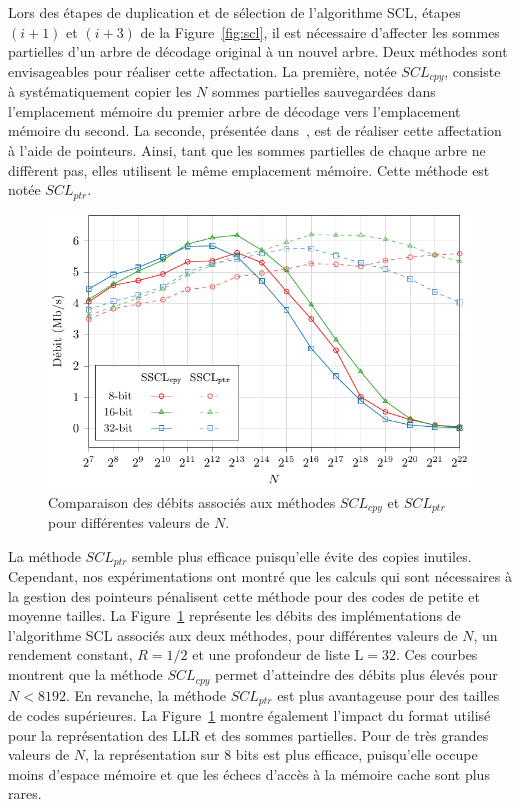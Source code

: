 Lors des étapes de duplication et de sélection de l'algorithme SCL, étapes $(i+1)$ et $(i+3)$ de la Figure~\ref{fig:scl}, il est nécessaire d'affecter les sommes partielles d'un arbre de décodage original à un nouvel arbre. Deux méthodes sont envisageables pour réaliser cette affectation. La première, notée $SCL_{cpy}$, consiste à systématiquement copier les $N$ sommes partielles sauvegardées dans l'emplacement mémoire du premier arbre de décodage vers l'emplacement mémoire du second. La seconde, présentée dans~\cite{tal_list_2011}, est de réaliser cette affectation à l'aide de pointeurs. Ainsi, tant que les sommes partielles de chaque arbre ne diffèrent pas, elles utilisent le même emplacement mémoire. Cette méthode est notée $SCL_{ptr}$.

\begin{figure}
\centering
\includegraphics{main/ch2_fig/curves/thr/tikz/thr}
\caption{Comparaison des débits associés aux méthodes $SCL_{cpy}$ et $SCL_{ptr}$ pour différentes valeurs de $N$.}
\label{fig:scl_mem}
\end{figure}

La méthode $SCL_{ptr}$ semble plus efficace puisqu'elle évite des copies inutiles. Cependant, nos expérimentations ont montré que les calculs qui sont nécessaires à la gestion des pointeurs pénalisent cette méthode pour des codes de petite et moyenne tailles. La Figure~\ref{fig:scl_mem} représente les débits des implémentations de l'algorithme SCL associés aux deux méthodes, pour différentes valeurs de $N$, un rendement constant, $R=1/2$ et une profondeur de liste $\mathrm{L}=32$. Ces courbes montrent que la méthode $SCL_{cpy}$ permet d'atteindre des débits plus élevés pour $N<8192$. En revanche, la méthode $SCL_{ptr}$ est plus avantageuse pour des tailles de codes supérieures. La Figure~\ref{fig:scl_mem} montre également l'impact du format utilisé pour la représentation des LLR et des sommes partielles. Pour de très grandes valeurs de $N$, la représentation sur 8 bits est plus efficace, puisqu'elle occupe moins d'espace mémoire et que les échecs d'accès à la mémoire cache sont plus rares. 

